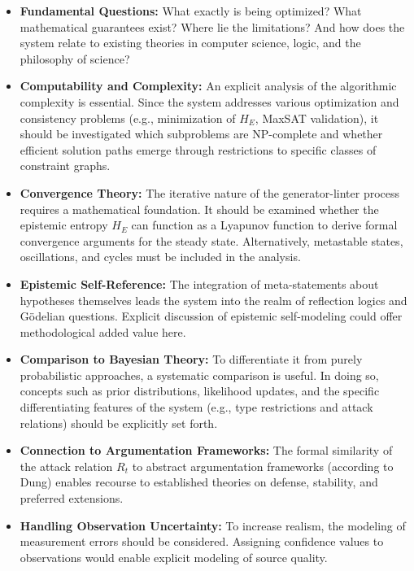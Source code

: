 \documentclass[11pt, a4paper]{article}
\begin{document}
	\begin{itemize}
		\item \textbf{Fundamental Questions:} What exactly is being optimized? What mathematical guarantees exist? Where lie the limitations? And how does the system relate to existing theories in computer science, logic, and the philosophy of science?
		\item \textbf{Computability and Complexity:} An explicit analysis of the algorithmic complexity is essential. Since the system addresses various optimization and consistency problems (e.g., minimization of $H_E$, MaxSAT validation), it should be investigated which subproblems are NP-complete and whether efficient solution paths emerge through restrictions to specific classes of constraint graphs.
		
		\item \textbf{Convergence Theory:} The iterative nature of the generator-linter process requires a mathematical foundation. It should be examined whether the epistemic entropy $H_E$ can function as a Lyapunov function to derive formal convergence arguments for the steady state. Alternatively, metastable states, oscillations, and cycles must be included in the analysis.
		
		\item \textbf{Epistemic Self-Reference:} The integration of meta-statements about hypotheses themselves leads the system into the realm of reflection logics and Gödelian questions. Explicit discussion of epistemic self-modeling could offer methodological added value here.
		
		\item \textbf{Comparison to Bayesian Theory:} To differentiate it from purely probabilistic approaches, a systematic comparison is useful. In doing so, concepts such as prior distributions, likelihood updates, and the specific differentiating features of the system (e.g., type restrictions and attack relations) should be explicitly set forth.
		
		\item \textbf{Connection to Argumentation Frameworks:} The formal similarity of the attack relation $R_t$ to abstract argumentation frameworks (according to Dung) enables recourse to established theories on defense, stability, and preferred extensions.
		
		\item \textbf{Handling Observation Uncertainty:} To increase realism, the modeling of measurement errors should be considered. Assigning confidence values to observations would enable explicit modeling of source quality.
		

\end{itemize}
\end{document}
